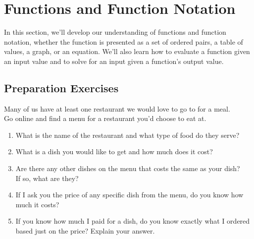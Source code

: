 
\section{Functions and Function Notation} \label{functions-and-notation}

In this section, we'll develop our understanding of functions and function notation, whether the function is presented as a set of ordered pairs, a table of values, a graph, or an equation.  We'll also learn how to evaluate a function given an input value and to solve for an input given a function's output value.\\[0.5em]

\subsection*{Preparation Exercises} \label{prep-functions-and-notation}


\begin{myPrep}
Many of us have at least one restaurant we would love to go to for a meal.  \\
Go online and find a menu for a restaurant you'd choose to eat at.
	\begin{enumerate}
		\item What is the name of the restaurant and what type of food do they serve?
		\vfill
		\item What is a dish you would like to get and how much does it cost?
		\vfill
		\item Are there any other dishes on the menu that costs the same as your dish? \\
		If so, what are they?
		\vfill
		\item If I ask you the price of any specific dish from the menu, do you know how much it costs? 
		\vfill
		\item If you know how much I paid for a dish, do you know exactly what I ordered based just on the price?  Explain your answer.
		\vfill
		\vfill
	\end{enumerate}
\end{myPrep}



